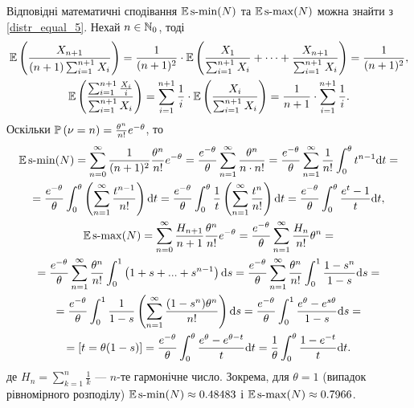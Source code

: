 Відповідні математичні сподівання $\E\smin(N)$ та $\E\smax(N)$ можна знайти з \eqref{distr_equal_5}. 
Нехай $n \in \N_0$, тоді
\begin{gather*}
    \E\left(
        \frac{X_{n+1}}{(n+1)\sum_{i=1}^{n+1} X_i}
    \right) = \frac{1}{(n+1)^2}\cdot \E \left(
        \frac{X_1}{\sum_{i=1}^{n+1} X_i} + \dots + \frac{X_{n+1}}{\sum_{i=1}^{n+1} X_i}
    \right) = \frac{1}{(n+1)^2}, \\
    \E\left(
        \frac{\sum_{i=1}^{n+1} \frac{X_i}{i}}{\sum_{i=1}^{n+1} X_i}
    \right) = 
    \sum_{i=1}^{n+1} \frac{1}{i} \cdot \E\left(\frac{X_i}{\sum_{i=1}^{n+1} X_i}\right) = 
    \frac{1}{n+1} \cdot \sum_{i=1}^{n+1} \frac{1}{i}.
\end{gather*}
Оскільки $\P{\nu = n} = \frac{\theta^n}{n!}e^{-\theta}$, то
\begin{gather*}
    \E\smin(N) = \sum_{n=0}^{\infty} \frac{1}{(n+1)^2} \frac{\theta^n}{n!}e^{-\theta} = \frac{e^{-\theta}}{\theta}\sum_{n=1}^{\infty} \frac{\theta^n}{n\cdot n!} =
    \frac{e^{-\theta}}{\theta} \sum_{n=1}^{\infty} \frac{1}{n!} \int_0^{\theta} t^{n-1} \d t = \\ =
    \frac{e^{-\theta}}{\theta} \int_0^{\theta} \left( \sum_{n=1}^{\infty} \frac{t^{n-1}}{n!} \right) \d t =
    \frac{e^{-\theta}}{\theta} \int_0^{\theta} \frac{1}{t} \left( \sum_{n=1}^{\infty} \frac{t^{n}}{n!} \right) \d t = 
    \frac{e^{-\theta}}{\theta}\int_0^\theta \frac{e^t-1}{t}\d t, \\
    \E\smax(N) = \sum_{n=0}^{\infty} \frac{H_{n+1}}{n+1} \frac{\theta^n}{n!}e^{-\theta} = \frac{e^{-\theta}}{\theta}\sum_{n=1}^{\infty} \frac{H_n}{n!} \theta^n = \\ =
    \frac{e^{-\theta}}{\theta}\sum_{n=1}^{\infty} \frac{\theta^n}{n!} \int_0^1 \left(1 + s + ... + s^{n-1}\right) \d s =
    \frac{e^{-\theta}}{\theta}\sum_{n=1}^{\infty} \frac{\theta^n}{n!} \int_0^1 \frac{1 - s^n}{1 - s} \d s = \\ =
    \frac{e^{-\theta}}{\theta} \int_0^1 \frac{1}{1 - s} \left(
        \sum_{n=1}^{\infty} \frac{(1 - s^n)\theta^n}{n!}
    \right) \d s = 
    \frac{e^{-\theta}}{\theta} \int_0^1 \frac{e^{\theta} - e^{s \theta}}{1 - s} \d s = \\ =
    \left[ t = \theta (1 - s)\right] = 
    \frac{e^{-\theta}}{\theta} \int_0^{\theta} \frac{e^{\theta} - e^{\theta - t}}{t} \d t = 
    \frac{1}{\theta} \int_0^{\theta} \frac{1-e^{-t}}{t}\d t.
\end{gather*}
де $H_n = \sum_{k=1}^n \frac{1}{k}$ --- $n$-те гармонічне число.
Зокрема, для $\theta = 1$ (випадок рівномірного розподілу) 
$\E\smin(N) \approx 0.48483$ і $\E\smax(N) \approx 0.7966$.

